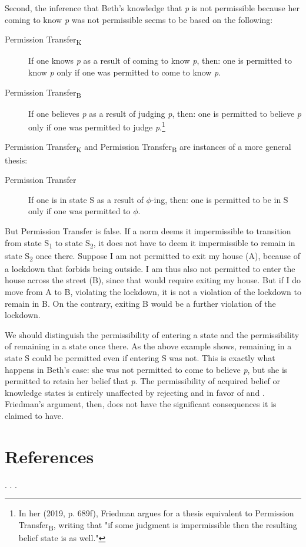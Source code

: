\documentclass[12pt]{article}
\begin{document}
Second, the inference that Beth's knowledge that \textit{p} is not permissible because her coming to know \textit{p} was not permissible seems to be based on the following:

\newcommand{\pp}{Permission Transfer}
\newcommand{\ppk}{\pp{\textsubscript{K}}}
\newcommand{\ppb}{\pp{\textsubscript{B}}}
\begin{description}
    \item[\ppk] If one knows \textit{p} as a result of coming to know \textit{p}, then: one is permitted to know \textit{p} only if one was permitted to come to know \textit{p}.
    \item[\ppb] If one believes \textit{p} as a result of judging \textit{p}, then: one is permitted to believe \textit{p} only if one was permitted to judge \textit{p}.\footnote{In her (2019, p. 689f), Friedman argues for a thesis equivalent to \ppb{}, writing that "if some judgment is impermissible then the resulting belief state is as well."}
\end{description}
%
\ppk{} and \ppb{} are instances of a more general thesis:

\begin{description}
    \item[\pp] If one is in state S as a result of $\phi$-ing, then: one is permitted to be in S only if one was permitted to $\phi$.
\end{description}
%
But \pp{} is false. If a norm deems it impermissible to transition from state S\textsubscript{1} to state S\textsubscript{2}, it does not have to deem it impermissible to remain in state S\textsubscript{2} once there. Suppose I am not permitted to exit my house (A), because of a lockdown that forbids being outside. I am thus also not permitted to enter the house across the street (B), since that would require exiting my house. But if I do move from A to B, violating the lockdown, it is not a violation of the lockdown to remain in B. On the contrary, exiting B would be a further violation of the lockdown.

We should distinguish the permissibility of entering a state and the permissibility of remaining in a state once there. As the above example shows, remaining in a state S could be permitted even if entering S was not. This is exactly what happens in Beth's case: she was not permitted to come to believe \textit{p}, but she is permitted to retain her belief that \textit{p}. The permissibility of acquired belief or knowledge states is entirely unaffected by rejecting \ep{} and \eo{} in favor of \ep*{} and \eo*{}. Friedman's argument, then, does not have the significant consequences it is claimed to have.

\section{References}

. . .
\end{document}
